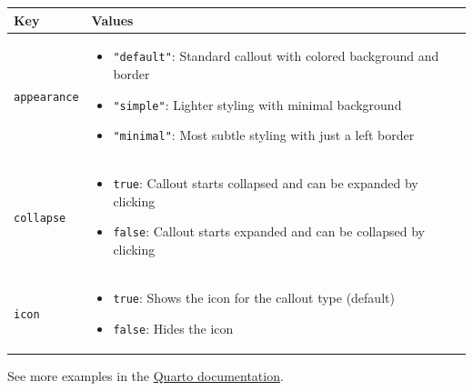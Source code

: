 \documentclass[
  letterpaper,
  DIV=11,
  numbers=noendperiod,
  oneside]{scrreprt}
\newcounter{none} %
\providecommand{\tightlist}{%
  \setlength{\itemsep}{0pt}\setlength{\parskip}{0pt}}
\begin{document}
\begin{tcolorbox}
{\def\LTcaptype{none} %
\begin{longtable}[]{@{}
  >{\raggedright\arraybackslash}p{}
  >{\raggedright\arraybackslash}p{}@{}}
\toprule\noalign{}
\begin{minipage}[b]{\linewidth}\raggedright
Key
\end{minipage} & \begin{minipage}[b]{\linewidth}\raggedright
Values
\end{minipage} \\
\midrule\noalign{}
\endhead
\bottomrule\noalign{}
\endlastfoot
\texttt{appearance} & \begin{minipage}[t]{\linewidth}\raggedright
\begin{itemize}
\tightlist
\item
  \texttt{"default"}: Standard callout with colored background and
  border
\item
  \texttt{"simple"}: Lighter styling with minimal background
\item
  \texttt{"minimal"}: Most subtle styling with just a left border
\end{itemize}
\end{minipage} \\
\texttt{collapse} & \begin{minipage}[t]{\linewidth}\raggedright
\begin{itemize}
\tightlist
\item
  \texttt{true}: Callout starts collapsed and can be expanded by
  clicking
\item
  \texttt{false}: Callout starts expanded and can be collapsed by
  clicking
\end{itemize}
\end{minipage} \\
\texttt{icon} & \begin{minipage}[t]{\linewidth}\raggedright
\begin{itemize}
\tightlist
\item
  \texttt{true}: Shows the icon for the callout type (default)
\item
  \texttt{false}: Hides the icon
\end{itemize}
\end{minipage} \\
\end{longtable}
}

See more examples in the
\href{https://quarto.org/docs/authoring/callouts.html}{Quarto
documentation}.


\end{tcolorbox}
\end{document}
